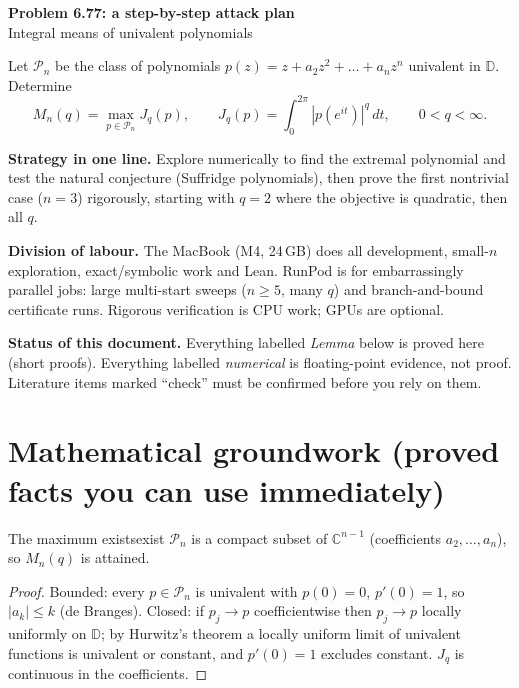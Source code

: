 \documentclass[11pt]{article}
\newcommand{\C}{\mathbb{C}}
\newcommand{\D}{\mathbb{D}}
\newcommand{\Pn}{\mathcal P_n}
\begin{document}
\begin{center}
{\LARGE\bfseries Problem 6.77: a step-by-step attack plan}\\[4pt]
{\large Integral means of univalent polynomials}
\end{center}

\begin{tcolorbox}[thmstyle, title={The problem}]
Let $\Pn$ be the class of polynomials $p(z)=z+a_2z^2+\dots+a_nz^n$ univalent in $\D$. Determine
\[
M_n(q)=\max_{p\in\Pn}J_q(p),\qquad J_q(p)=\int_0^{2\pi}|p(e^{it})|^q\,dt,\qquad 0<q<\infty .
\]
\end{tcolorbox}

\textbf{Strategy in one line.} Explore numerically to find the extremal polynomial and test the natural conjecture (Suffridge polynomials), then prove the first nontrivial case ($n=3$) rigorously, starting with $q=2$ where the objective is quadratic, then all $q$.

\textbf{Division of labour.} The MacBook (M4, 24\,GB) does all development, small-$n$ exploration, exact/symbolic work and Lean. RunPod is for embarrassingly parallel jobs: large multi-start sweeps ($n\ge5$, many $q$) and branch-and-bound certificate runs. Rigorous verification is CPU work; GPUs are optional.

\textbf{Status of this document.} Everything labelled \emph{Lemma} below is proved here (short proofs). Everything labelled \emph{numerical} is floating-point evidence, not proof. Literature items marked ``check'' must be confirmed before you rely on them.

{\small\setlength{\parskip}{0pt}\tableofcontents}

\section{Mathematical groundwork (proved facts you can use immediately)}

\begin{lemma}{The maximum exists}{exist}
$\Pn$ is a compact subset of $\C^{n-1}$ (coefficients $a_2,\dots,a_n$), so $M_n(q)$ is attained.
\end{lemma}
\begin{proof}
Bounded: every $p\in\Pn$ is univalent with $p(0)=0$, $p'(0)=1$, so $|a_k|\le k$ (de Branges). Closed: if $p_j\to p$ coefficientwise then $p_j\to p$ locally uniformly on $\D$; by Hurwitz's theorem a locally uniform limit of univalent functions is univalent or constant, and $p'(0)=1$ excludes constant. $J_q$ is continuous in the coefficients.
\end{proof}
\end{document}
